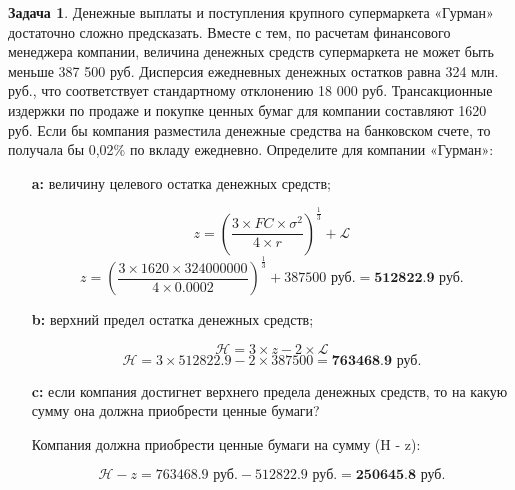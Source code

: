 \documentclass[a4paper, 14pt]{article}
\theoremstyle{plain} %
\theoremstyle{definition} %
\newtheorem{problem}{Задача}[subsection]
\theoremstyle{remark} %
\begin{document}
\begin{problem}
	Денежные  выплаты  и  поступления  крупного  супермаркета «Гурман» достаточно сложно предсказать. Вместе с тем, по расчетам финансового менеджера  компании,  величина  денежных  средств  супермаркета  не  может  быть меньше 387 500 руб. Дисперсия ежедневных денежных остатков равна 324 млн. руб.,  что  соответствует  стандартному  отклонению  18 000  руб.  Трансакционные издержки по продаже и покупке ценных бумаг для компании составляют 1620 руб. Если  бы  компания  разместила  денежные  средства  на  банковском  счете,  то получала бы 0,02\% по вкладу ежедневно. Определите для компании «Гурман»:
	\begin{itemize}
		\item[\textbf{a:}] величину целевого остатка денежных средств;

		\[
			z = \left(\frac{3\times FC \times \sigma^2}{4\times r}\right)^{\frac{1}{3}} + \mathcal{L}
		\]
		\[
			z = \left(\frac{3\times 1620 \times 324000000}{4\times 0.0002}\right)^{\frac{1}{3}} + \text{387500 руб.} = \textbf{512822.9 руб.}
		\]
\newpage
		\item[\textbf{b:}] верхний предел остатка денежных средств;

		\[
			\mathcal{H} = 3\times z - 2 \times \mathcal{L}
		\]
		\[
			\mathcal{H} = 3 \times 512822.9 - 2 \times 387500 = \textbf{763468.9 руб.}
		\]
		\item[\textbf{c:}] если  компания  достигнет  верхнего  предела  денежных средств, то на какую сумму она должна приобрести ценные бумаги?

		Компания  должна  приобрести  ценные  бумаги  на  сумму (H - z):

		\[
			\mathcal{H} - z = \text{763468.9 руб.} - \text{512822.9 руб.} = \textbf{250645.8 руб.}
		\]
	\end{itemize}
\end{problem}
\end{document}
